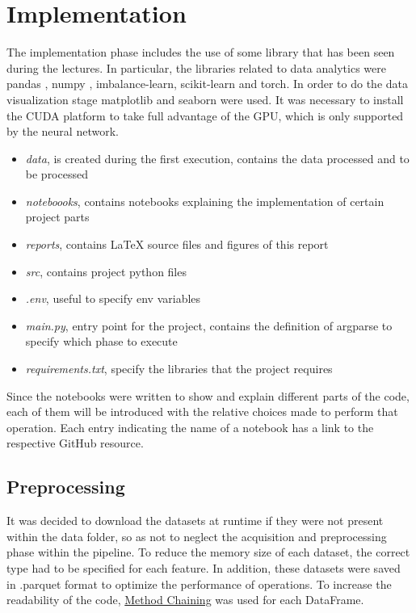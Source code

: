 \documentclass[../main]{subfiles}
\begin{document}
\chapter{Implementation}
The implementation phase includes the use of some library that has been seen during the lectures.
In particular, the libraries related to data analytics were pandas \cite{reback2020pandas}, numpy \cite{harris2020array}, imbalance-learn, scikit-learn and torch.
In order to do the data visualization stage matplotlib \cite{Hunter:2007} and seaborn \cite{Waskom2021} were used.
It was necessary to install the CUDA platform \cite{cuda} to take full advantage of the GPU, which is only supported by the neural network.
\begin{itemize}
    \item \textit{data}, is created during the first execution, contains the data processed and to be processed
    \item \textit{noteboooks}, contains notebooks explaining the implementation of certain project parts
    \item \textit{reports}, contains LaTeX source files and figures of this report
    \item \textit{src}, contains project python files
    \item \textit{.env}, useful to specify env variables
    \item \textit{main.py}, entry point for the project, contains the definition of argparse to specify which phase to execute
    \item \textit{requirements.txt}, specify the libraries that the project requires
\end{itemize}
Since the notebooks were written to show and explain different parts of the code, each of them will be introduced with the relative choices made to perform that operation.
Each entry indicating the name of a notebook has a link to the respective GitHub resource.

\section{Preprocessing}
It was decided to download the datasets at runtime if they were not present within the data folder, so as not to neglect the acquisition and preprocessing phase within the pipeline.
To reduce the memory size of each dataset, the correct type had to be specified for each feature.
In addition, these datasets were saved in .parquet format to optimize the performance of operations.
To increase the readability of the code, \href{https://tomaugspurger.github.io/method-chaining.html}{Method Chaining} was used for each DataFrame.
\end{document}
